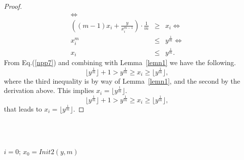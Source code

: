\documentclass[11pt]{article}
\newcommand{\floor}[1]{\lfloor #1 \rfloor}
\begin{document}
\begin{proof}
\begin{eqnarray}
                  \Leftrightarrow \nonumber \\
     \left( (m-1) x_i +   \frac{y}{x_i^{m-1}}
     \right) \cdot  \frac{1}{m}
 &\geq& x_i       \Leftrightarrow \nonumber \\
    x_i^m &\leq& y^{\frac{1}{m}}
                  \Leftrightarrow \nonumber \\
\label{npp7}
    x_i &\leq& y^{\frac{1}{m}}.
\end{eqnarray}
From Eq.(\ref{npp7}) and combining with Lemma~\ref{lemn1} we have
the following.
\[
\floor{ y^{\frac{1}{m}}}+ 1
> y^{\frac{1}{m}} \geq x_i \geq \floor{ y^{\frac{1}{m}}} ,
\]
where the third
inequality is by way of Lemma~\ref{lemn1}, and
the second by the derivation above.
This implies $x_i = \floor{ y^{\frac{1}{m}}}$.
\[
\floor{ y^{\frac{1}{m}}}+ 1
> y^{\frac{1}{m}} \geq x_i \geq \floor{ y^{\frac{1}{m}}} ,
\]
that leads to $x_i = \floor{ y^{\frac{1}{m}}}$.
\end{proof}
$ $ \\  $ $
\begin{algorithm}[H]


 $i=0$;
 $x_0 = Init2(y,m)$  


 \caption{FindFloor2(y,m) : Find $\lfloor y^{1/m} \rfloor$}
 \label{F2}
\end{algorithm}

\begin{algorithm}[H]



 \caption{CheckCandidateSolution(x,y,m) : Is $x= \lfloor y^{1/m} \rfloor$?}
 \label{CF}
\end{algorithm}
\end{document}
